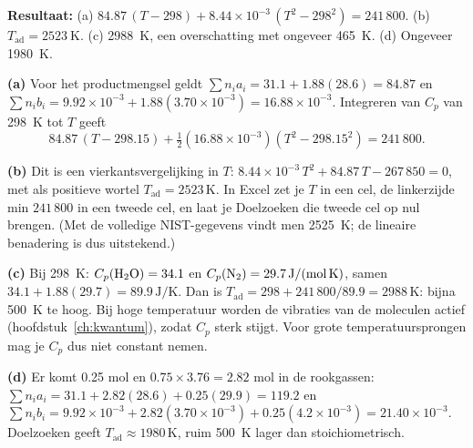 \begin{oplossing}
\textbf{Resultaat:} (a) $84.87\,(T-298) + 8.44\times10^{-3}\,(T^2-298^2) = 241\,800$. (b) $T_\mathrm{ad} = \SI{2523}{\kelvin}$. (c) \SI{2988}{\kelvin}, een overschatting met ongeveer \SI{465}{\kelvin}. (d) Ongeveer \SI{1980}{\kelvin}.

\textbf{(a)} Voor het productmengsel geldt $\sum n_i a_i = 31.1 + 1.88(28.6) = 84.87$ en $\sum n_i b_i = 9.92\times10^{-3} + 1.88(3.70\times10^{-3}) = 16.88\times10^{-3}$. Integreren van $C_p$ van \SI{298}{\kelvin} tot $T$ geeft
\[
84.87\,(T - 298.15) + \tfrac{1}{2}(16.88\times10^{-3})(T^2 - 298.15^2) = 241\,800.
\]

\textbf{(b)} Dit is een vierkantsvergelijking in $T$: $8.44\times10^{-3}\,T^2 + 84.87\,T - 267\,850 = 0$, met als positieve wortel $T_\mathrm{ad} = 2523\,\mathrm{K}$. In Excel zet je $T$ in een cel, de linkerzijde min $241\,800$ in een tweede cel, en laat je Doelzoeken die tweede cel op nul brengen. (Met de volledige NIST-gegevens vindt men \SI{2525}{\kelvin}; de lineaire benadering is dus uitstekend.)

\textbf{(c)} Bij \SI{298}{\kelvin}: $C_p(\ce{H2O}) = 34.1$ en $C_p(\ce{N2}) = 29.7\,\mathrm{J/(mol\,K)}$, samen $34.1 + 1.88(29.7) = 89.9\,\mathrm{J/K}$. Dan is $T_\mathrm{ad} = 298 + 241\,800/89.9 = 2988\,\mathrm{K}$: bijna \SI{500}{\kelvin} te hoog. Bij hoge temperatuur worden de vibraties van de moleculen actief (hoofdstuk~\ref{ch:kwantum}), zodat $C_p$ sterk stijgt. Voor grote temperatuursprongen mag je $C_p$ dus niet constant nemen.

\textbf{(d)} Er komt 0.25 mol  en $0.75 \times 3.76 = 2.82$ mol  in de rookgassen: $\sum n_i a_i = 31.1 + 2.82(28.6) + 0.25(29.9) = 119.2$ en $\sum n_i b_i = 9.92\times10^{-3} + 2.82(3.70\times10^{-3}) + 0.25(4.2\times10^{-3}) = 21.40\times10^{-3}$. Doelzoeken geeft $T_\mathrm{ad} \approx 1980\,\mathrm{K}$, ruim \SI{500}{\kelvin} lager dan stoichiometrisch.
\end{oplossing}

